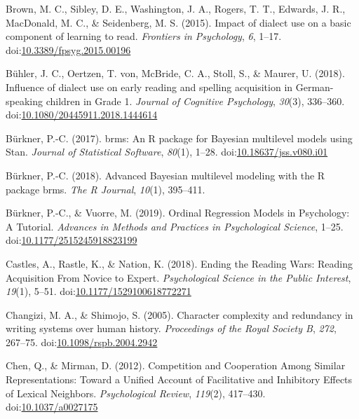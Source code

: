 \documentclass[doc,floatsintext]{apa6}
\begin{document}
\hypertarget{ref-Brown2015}{}
Brown, M. C., Sibley, D. E., Washington, J. A., Rogers, T. T., Edwards,
J. R., MacDonald, M. C., \& Seidenberg, M. S. (2015). Impact of dialect
use on a basic component of learning to read. \emph{Frontiers in
Psychology}, \emph{6}, 1--17.
doi:\href{https://doi.org/10.3389/fpsyg.2015.00196}{10.3389/fpsyg.2015.00196}

\hypertarget{ref-Buhler2018}{}
Bühler, J. C., Oertzen, T. von, McBride, C. A., Stoll, S., \& Maurer, U.
(2018). Influence of dialect use on early reading and spelling
acquisition in German-speaking children in Grade 1. \emph{Journal of
Cognitive Psychology}, \emph{30}(3), 336--360.
doi:\href{https://doi.org/10.1080/20445911.2018.1444614}{10.1080/20445911.2018.1444614}

\hypertarget{ref-R-brms_a}{}
Bürkner, P.-C. (2017). brms: An R package for Bayesian multilevel models
using Stan. \emph{Journal of Statistical Software}, \emph{80}(1), 1--28.
doi:\href{https://doi.org/10.18637/jss.v080.i01}{10.18637/jss.v080.i01}

\hypertarget{ref-R-brms_b}{}
Bürkner, P.-C. (2018). Advanced Bayesian multilevel modeling with the R
package brms. \emph{The R Journal}, \emph{10}(1), 395--411.

\hypertarget{ref-Burkner2019}{}
Bürkner, P.-C., \& Vuorre, M. (2019). Ordinal Regression Models in
Psychology: A Tutorial. \emph{Advances in Methods and Practices in
Psychological Science}, 1--25.
doi:\href{https://doi.org/10.1177/2515245918823199}{10.1177/2515245918823199}

\hypertarget{ref-Castles2018}{}
Castles, A., Rastle, K., \& Nation, K. (2018). Ending the Reading Wars:
Reading Acquisition From Novice to Expert. \emph{Psychological Science
in the Public Interest}, \emph{19}(1), 5--51.
doi:\href{https://doi.org/10.1177/1529100618772271}{10.1177/1529100618772271}

\hypertarget{ref-Changizi2005}{}
Changizi, M. A., \& Shimojo, S. (2005). Character complexity and
redundancy in writing systems over human history. \emph{Proceedings of
the Royal Society B}, \emph{272}, 267--75.
doi:\href{https://doi.org/10.1098/rspb.2004.2942}{10.1098/rspb.2004.2942}

\hypertarget{ref-Chen2012}{}
Chen, Q., \& Mirman, D. (2012). Competition and Cooperation Among
Similar Representations: Toward a Unified Account of Facilitative and
Inhibitory Effects of Lexical Neighbors. \emph{Psychological Review},
\emph{119}(2), 417--430.
doi:\href{https://doi.org/10.1037/a0027175}{10.1037/a0027175}
\end{document}
